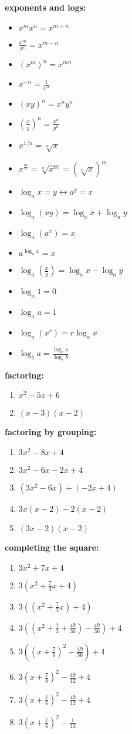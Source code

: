 \documentclass{article}
\begin{document}
\textbf{exponents and logs:} 
	\begin{itemize}
		\item $x^mx^n = x^{m+n}$
		\item $\frac{x^m}{x^n} = x^{m-n}$
		\item $(x^m)^n = x^{mn}$
		\item $x^{-n} = \frac{1}{x^n}$
		\item $(xy)^n = x^ny^n$
		\item $(\frac{x}{y})^n = \frac{x^n}{y^n}$ \item $x^{1/n} = \sqrt[n]{x}$
		\item $x^{\frac{m}{n}} = \sqrt[n]{x^m} = (\sqrt[n]{x})^m$
		\item $\log_ax = y \leftrightarrow a^y = x$
		\item $\log_a(xy) = \log_ax + \log_ay$
		\item $\log_a(a^x) = x$
		\item $a^{\log_a x} = x$
		\item $\log_a(\frac{x}{y}) = \log_ax - \log_ay$
		\item $\log_a1 = 0$
		\item $\log_aa = 1$
		\item $\log_a(x^r) = r\log_ax$
		\item $\log_ba = \frac{\log_ca}{\log_cb}$
	\end{itemize}

\textbf{factoring:}
	\begin{enumerate}
		\item $x^2 - 5x + 6$
		\item $(x - 3)(x - 2)$
	\end{enumerate}

\textbf{factoring by grouping:}
	\begin{enumerate}
		\item $3x^2 -8x + 4$
		\item $3x^2 - 6x -2x + 4$
		\item $(3x^2 - 6x) + (-2x + 4)$
		\item $3x(x - 2) - 2(x - 2)$
		\item $(3x - 2)(x-2)$
	\end{enumerate}

\textbf{completing the square:}
	\begin{enumerate}
		\item $3x^2 + 7x + 4$
		\item $3(x^2 + \frac{7}{3}x + 4)$
		\item $3((x^2 + \frac{7}{3}x) + 4)$
		\item $3((x^2 + \frac{7}{3} + \frac{49}{36}) - \frac{49}{36}) + 4$
		\item $3((x + \frac{7}{6})^2 - \frac{49}{36}) + 4$
		\item $3(x + \frac{7}{6})^2 - \frac{49}{12} + 4$
		\item $3(x + \frac{7}{6})^2 - \frac{49}{12} + 4$
		\item $3(x + \frac{7}{6})^2 - \frac{1}{12}$
	\end{enumerate}
\end{document}
